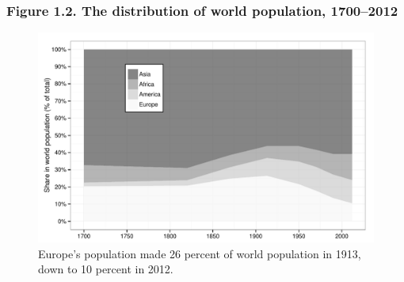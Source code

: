 \documentclass[t]{beamer}\usepackage[]{graphicx}\usepackage[]{color}
\newenvironment{knitrout}{}{} %
\begin{document}
\begin{frame}[label=Figure_1_2b]
\frametitle{Figure 1.2. The distribution of world population, 1700--2012}
\begin{figure}[t]
\begin{minipage}[b]{\textwidth}
\centering
\begin{knitrout}\footnotesize
{}\color{fgcolor}

{\centering \includegraphics[width=1\linewidth]{figures/bw/Figure_1_2b} 

}



\end{knitrout}
\caption{Europe's population made 26 percent of world population in 1913, down to 10 percent in 2012.}
\end{minipage}
\end{figure}
\end{frame}
\end{document}
